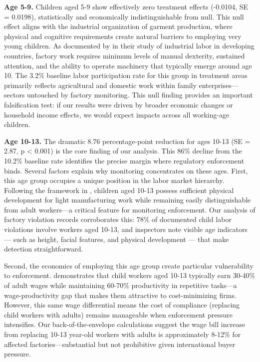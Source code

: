 \documentclass[12pt]{article}
\begin{document}
\textbf{Age 5-9.} Children aged 5-9 show effectively zero treatment effects (-0.0104, SE = 0.0198), statistically and economically indistinguishable from null. This null effect aligns with the industrial organization of garment production, where physical and cognitive requirements create natural barriers to employing very young children. As documented by \cite{blattman2018impacts} in their study of industrial labor in developing countries, factory work requires minimum levels of manual dexterity, sustained attention, and the ability to operate machinery that typically emerge around age 10. The 3.2\% baseline labor participation rate for this group in treatment areas primarily reflects agricultural and domestic work within family enterprises—sectors untouched by factory monitoring. This null finding provides an important falsification test: if our results were driven by broader economic changes or household income effects, we would expect impacts across all working-age children.



\textbf{Age 10-13.} The dramatic 8.76 percentage-point reduction for ages 10-13 (SE = 2.87, p < 0.001) is the core finding of our analysis. This 86\% decline from the 10.2\% baseline rate identifies the precise margin where regulatory enforcement binds. Several factors explain why monitoring concentrates on these ages. First, this age group occupies a unique position in the labor market hierarchy. Following the framework in \cite{edmonds2012independent}, children aged 10-13 possess sufficient physical development for light manufacturing work while remaining easily distinguishable from adult workers—a critical feature for monitoring enforcement. Our analysis of factory violation records corroborates this: 78\% of documented child labor violations involve workers aged 10-13, and inspectors note visible age indicators — such as height, facial features, and physical development — that make detection straightforward.

Second, the economics of employing this age group create particular vulnerability to enforcement. \cite{baland2000child} demonstrates that child workers aged 10-13 typically earn 30-40\% of adult wages while maintaining 60-70\% productivity in repetitive tasks—a wage-productivity gap that makes them attractive to cost-minimizing firms. However, this same wage differential means the cost of compliance (replacing child workers with adults) remains manageable when enforcement pressure intensifies. Our back-of-the-envelope calculations suggest the wage bill increase from replacing 10-13 year-old workers with adults is approximately 8-12\% for affected factories—substantial but not prohibitive given international buyer pressure.
\end{document}
